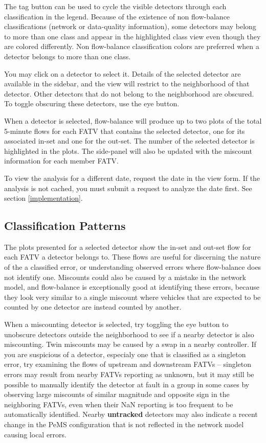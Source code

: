 \documentclass[titlepage]{article}
\begin{document}
The tag button can be used to cycle the visible detectors through each classification in the legend. Because of the existence of non flow-balance classifications (network or data-quality information), some detectors may belong to more than one class and appear in the highlighted class view even though they are colored differently. Non flow-balance classification colors are preferred when a detector belongs to more than one class.

You may click on a detector to select it. Details of the selected detector are available in the sidebar, and the view will restrict to the neighborhood of that detector. Other detectors that do not belong to the neighborhood are obscured. To toggle obscuring these detectors, use the eye button.

When a detector is selected, flow-balance will produce up to two plots of the total 5-minute flows for each FATV that contains the selected detector, one for its associated in-set and one for the out-set. The number of the selected detector is highlighted in the plots. The side-panel will also be updated with the miscount information for each member FATV.

To view the analysis for a different date, request the date in the view form. If the analysis is not cached, you must submit a request to analyze the date first. See section \ref{implementation}.

\subsection{Classification Patterns}
The plots presented for a selected detector show the in-set and out-set flow for each FATV a detector belongs to. These flows are useful for discerning the nature of the a classified error, or understanding observed errors where flow-balance does not identify one. Miscounts could also be caused by a mistake in the network model, and flow-balance is exceptionally good at identifying these errors, because they look very similar to a single miscount where vehicles that are expected to be counted by one detector are instead counted by another.

When a miscounting detector is selected, try toggling the eye button to unobscure detectors outside the neighborhood to see if a nearby detector is also miscounting. Twin miscounts may be caused by a swap in a nearby controller. If you are suspicious of a detector, especialy one that is classified as a singleton error, try examining the flows of upstream and downstream FATVs -- singleton errors may result from nearby FATVs reporting as unknown, but it may still be possible to manually identify the detector at fault in a group in some cases by observing large miscounts of similar magnitude and opposite sign in the neighboring FATVs, even when their NaN reporting is too frequent to be automatically identified. Nearby \textbf{untracked} detectors may also indicate a recent change in the PeMS configuration that is not reflected in the network model causing local errors.
\end{document}
